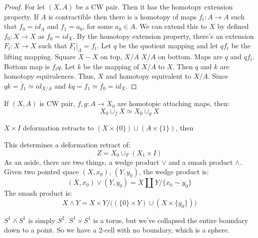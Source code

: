         \begin{proof}
            For let $(X,A)$ be a CW pair. Then it has the
            homotopy extension property. If $A$ is contractible
            then there is a homotopy of maps
            $f_{t}:A\rightarrow{A}$ such that $f_{0}=id_{A}$ and
            $f_{1}=a_{0}$, for some $a_{0}\in{A}$. We can
            extend this to $X$ by defined
            $f_{0}:X\rightarrow{X}$ as $f_{0}=id_{X}$. By
            the homotopy extension property, there's an
            extension $F_{t}:X\rightarrow{X}$ such that
            $F_{t}|_{A}=f_{t}$. Let $q$ be the quotient
            mapping and let $qf_{t}$ be the lifting mapping.
            Square $X-X$ on top, $X/A$ $X/A$ on bottom. Maps are
            $q$ and $qf_{t}$. Bottom map is
            $\overline{f}_{t}q$. Let $k$ be the mapping
            of $X/A$ to $X$. Then $q$ and $k$ are homotopy
            equivalences. Thus, $X$ and homotopy equivalent
            to $X/A$. Since $qk=\overline{f}_{1}\simeq{id}_{X/A}$
            and $kq=f_{1}\simeq{f}_{0}=id_{X}$.
        \end{proof}
        \begin{theorem}
            If $(X,A)$ is CW pair, $f,g:A\rightarrow{X_{0}}$
            are homotopic attaching maps, then:
            \begin{equation}
                X_{0}\cup_{f}X\simeq{X}_{0}\cup_{g}X
            \end{equation}
        \end{theorem}
        \begin{theorem}
            $X\times{I}$ deformation retracts to
            $(X\times\{0\})\cup(A\times\{1\})$, then
        \end{theorem}
        This determines a deformation retract of:
        \begin{equation}
            Z=X_{0}\cup_{F}(X_{1}\times{I})
        \end{equation}
        As an aside, there are two things, a wedge product
        $\lor$ and a smash product $\land$. Given two pointed
        space $(X,x_{0})$, $(Y,y_{0})$, the wedge product is:
        \begin{equation}
            (X,x_{0})\lor(Y,y_{0})
            =X\coprod{Y}/\{x_{0}\sim{y}_{0}\}
        \end{equation}
        The smash product is:
        \begin{equation}
            X\land{Y}=
            X\times{Y}/\Big(
                (\{0\}\times{Y})\cup(X\times\{y_{0}\})
            \Big)
        \end{equation}
        \begin{example}
            $S^{1}\land{S}^{1}$ is simply $S^{2}$.
            $S^{1}\times{S}^{1}$ is a torus, but we've collapsed
            the entire boundary down to a point. So we have a
            2-cell with no boundary, which is a sphere.
        \end{example}
